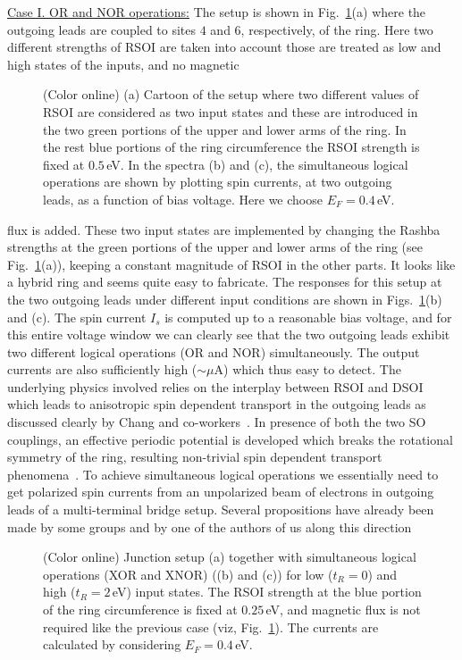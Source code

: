 \documentclass[doublecol]{epl2}
\begin{document}
\vskip 0.25cm
\noindent
{\underline{Case I. OR and NOR operations:}} The setup is shown in 
Fig.~\ref{fig2}(a) where the outgoing leads are coupled to sites $4$ and $6$,
respectively, of the ring. Here two different strengths of RSOI are taken into 
account those are treated as low and high states of the inputs, and no magnetic 
\begin{figure}[ht]
{\centering {}\par}
\caption{(Color online) (a) Cartoon of the setup where two different values of
RSOI are considered as two input states and these are introduced in the two 
green portions of the upper and lower arms of the ring. In the rest blue 
portions of the ring circumference the RSOI strength is fixed at $0.5\,$eV.
In the spectra (b) and (c), the simultaneous logical operations are shown by 
plotting spin currents, at two outgoing leads, as a function of bias voltage.
Here we choose $E_F=0.4\,$eV.}
\label{fig2}
\end{figure}
flux is added. These two input states are implemented by changing the Rashba 
strengths at the green portions of the upper and lower arms of the ring 
(see Fig.~\ref{fig2}(a)), keeping a constant magnitude of RSOI in the other 
parts. It looks like a hybrid ring and seems quite easy to fabricate. 
The responses for this setup at the two outgoing leads under different 
input conditions are shown in Figs.~\ref{fig2}(b) and (c). The spin current 
$I_s$ is computed up to a reasonable bias voltage, and for this entire 
voltage window we can clearly see that the two outgoing leads exhibit two 
different logical operations (OR and NOR) simultaneously. The output 
currents are also sufficiently high ($\sim \mu$A) which thus easy to detect. 
The underlying physics involved relies on the interplay between RSOI 
and DSOI which leads to anisotropic spin dependent transport in the outgoing
leads as discussed clearly by Chang and co-workers~\cite{ham1,chnew,chnew1}. 
In presence of both the two SO couplings, an effective periodic potential 
is developed which breaks the rotational symmetry of the ring, resulting 
non-trivial spin dependent transport phenomena~\cite{ham1,chnew,chnew1}. 
To achieve simultaneous logical operations we essentially need to get 
polarized spin currents from an unpolarized beam of electrons in outgoing 
leads of a multi-terminal bridge setup. Several propositions have already 
been made by some groups and by one of the authors of us along this direction 
\begin{figure}[ht]
{\centering {}\par}
\caption{(Color online) Junction setup (a) together with simultaneous logical
operations (XOR and XNOR) ((b) and (c)) for low ($t_R=0$) and high ($t_R=2\,$eV)
input states. The RSOI strength at the blue portion of the ring circumference is
fixed at $0.25\,$eV, and magnetic flux is not required like the previous case 
(viz, Fig.~\ref{fig2}). The currents are calculated by considering $E_F=0.4\,$eV.}
\label{fig3}
\end{figure}
\end{document}
